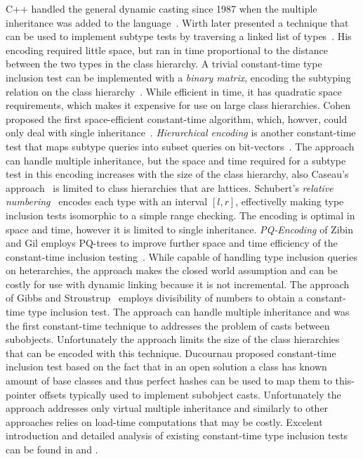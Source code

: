 C++ handled the general dynamic casting since 1987 when the multiple inheritance 
was added to the language~\cite{Str87}. Wirth later presented a technique that 
can be used to implement subtype tests by traversing a linked list of 
types~\cite{Wirth88}. His encoding required little space, but ran in time 
proportional to the distance between the two types in the class hierarchy. 
A trivial constant-time type inclusion test can be implemented with a 
\emph{binary matrix}, encoding the subtyping relation on the class 
hierarchy~\cite{Vortex96}. While efficient in time, it has quadratic space 
requirements, which makes it expensive for use on large class hierarchies. Cohen 
proposed the first space-efficient constant-time algorithm, which, howver, could 
only deal with single inheritance~\cite{Cohen91}. \emph{Hierarchical encoding} 
is another constant-time test that maps subtype queries into subset queries on 
bit-vectors~\cite{Caseau93,Krall97nearoptimal}. The approach can handle multiple
inheritance, but the space and time required for a subtype test in this encoding 
increases with the size of the class hierarchy, also Caseau's approach~\cite{Caseau93} is 
limited to class hierarchies that are lattices. Schubert's \emph{relative 
numbering}~\cite{Schubert83} encodes each type with an interval $[l,r]$, 
effectivelly making type inclusion tests isomorphic to a simple range checking. 
The encoding is optimal in space and time, however it is limited to single 
inheritance. \emph{PQ-Encoding} of Zibin and Gil employs PQ-trees to improve 
further space and time efficiency of the constant-time inclusion 
testing~\cite{PQEncoding}. While capable of handling type inclusion queries on 
heterarchies, the approach makes the closed world assumption and can be costly 
for use with dynamic linking because it is not incremental.
The approach of Gibbs and Stroustrup~\cite{FastDynCast} employs divisibility of 
numbers to obtain a constant-time type inclusion test. The approach can handle 
multiple inheritance and was the first constant-time technique to addresses the 
problem of casts between subobjects. Unfortunately the approach limits the size 
of the class hierarchies that can be encoded with this technique. 
Ducournau proposed constant-time inclusion test based on the fact that in an 
open solution a class has known amount of base classes and thus perfect hashes 
can be used to map them to this-pointer offsets typically used to implement 
subobject casts\cite{Ducournau08}. Unfortunately the approach addresses only 
virtual multiple inheritance and similarly to other approaches relies on 
load-time computations that may be costly. Excelent introduction and detailed 
analysis of existing constant-time type inclusion tests can be found in 
\cite{Vitek97} and \cite{PQEncoding}.


